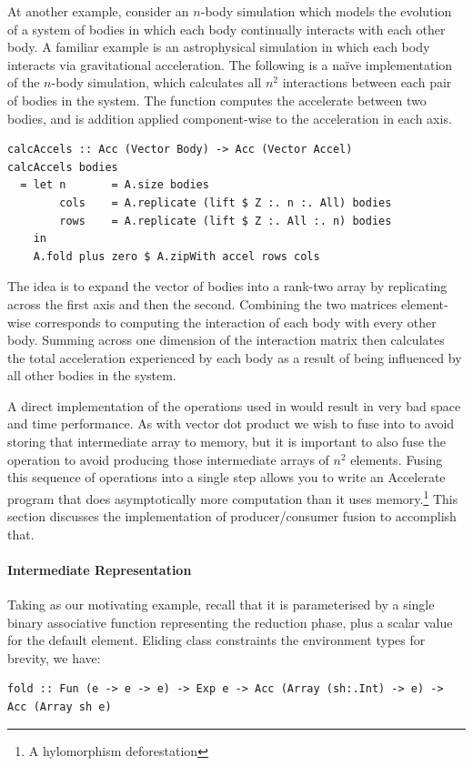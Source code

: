 At another example, consider an $n$-body simulation which models the evolution
of a system of bodies in which each body continually interacts with each other
body. A familiar example is an astrophysical simulation in which each body
interacts via gravitational acceleration. The following is a na\"ive
implementation of the $n$-body simulation, which calculates all $n^{2}$
interactions between each pair of bodies in the system. The function
 computes the accelerate between two bodies, and  is
addition applied component-wise to the acceleration in each axis.
%
\begin{lstlisting}[style=haskell]
calcAccels :: Acc (Vector Body) -> Acc (Vector Accel)
calcAccels bodies
  = let n       = A.size bodies
        cols    = A.replicate (lift $ Z :. n :. All) bodies
        rows    = A.replicate (lift $ Z :. All :. n) bodies
    in
    A.fold plus zero $ A.zipWith accel rows cols
\end{lstlisting}
%
The idea is to expand the vector of bodies into a rank-two array by replicating
across the first axis and then the second. Combining the two matrices
element-wise corresponds to computing the interaction of each body with every
other body. Summing across one dimension of the interaction matrix then
calculates the total acceleration experienced by each body as a result of being
influenced by all other bodies in the system.

A direct implementation of the operations used in  would
result in very bad space and time performance. As with vector dot product we
wish to fuse  into  to avoid storing that
intermediate array to memory, but it is important to also fuse the
 operation to avoid producing those intermediate arrays of
$n^2$ elements. Fusing this sequence of operations into a single step allows you
to write an Accelerate program that does asymptotically more computation than it
uses memory.\footnote{A hylomorphism deforestation} This section discusses the
implementation of producer/consumer fusion to accomplish that.


\paragraph{Intermediate Representation}

%
Taking  as our motivating example, recall that it is parameterised
by a single binary associative function representing the reduction phase, plus a
scalar value for the default element. Eliding class constraints the environment
types for brevity, we have:
%
\begin{lstlisting}[style=haskell,numbers=none]
fold :: Fun (e -> e -> e) -> Exp e -> Acc (Array (sh:.Int) -> e) -> Acc (Array sh e)
\end{lstlisting}

